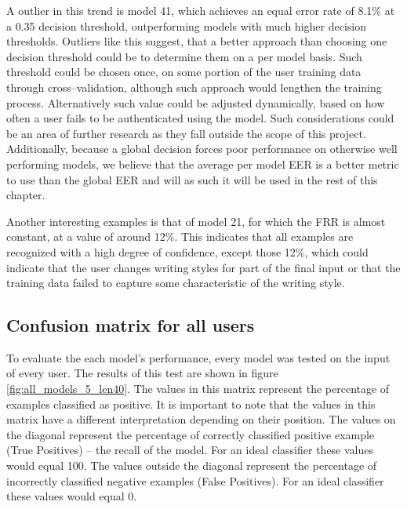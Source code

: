 A outlier in this trend is model 41, which achieves an equal error rate of 8.1\% at a 0.35 decision threshold, outperforming models with much higher decision thresholds. Outliers like this suggest, that a better approach than choosing one decision threshold could be to determine them on a per model basis. Such threshold could be chosen once, on some portion of the user training data through cross--validation, although such approach would lengthen the training process. Alternatively such value could be adjusted dynamically, based on how often a user fails to be authenticated using the model. Such considerations could be an area of further research as they fall outside the scope of this project.\\
Additionally, because a global decision forces poor performance on otherwise well performing models, we believe that the average per model EER is a better metric to use than the global EER and will as such it will be used in the rest of this chapter.

Another interesting examples is that of model 21, for which the FRR is almost constant, at a value of around 12\%. This indicates that all examples are recognized with a high degree of confidence, except those 12\%, which could indicate that the user changes writing styles for part of the final input or that the training data failed to capture some characteristic of the writing style.

\subsection{Confusion matrix for all users}
To evaluate the each model's performance, every model was tested on the input of every user. The results of this test are shown in figure \ref{fig:all_models_5_len40}. The values in this matrix represent the percentage of examples classified as positive. It is important to note that the values in this matrix have a different interpretation depending on their position. The values on the diagonal represent the percentage of correctly classified positive example (True Positives) -- the recall of the model. For an ideal classifier these values would equal 100. The values outside the diagonal represent the percentage of incorrectly classified negative examples (False Positives). For an ideal classifier these values would equal 0.

